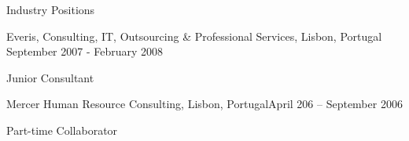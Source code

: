 
\begin{rSection}{Industry Positions}



\begin{rSubsection}{Everis, Consulting, IT, Outsourcing \&  Professional  \newline Services, Lisbon, Portugal}{ September 2007 - February 2008}{}{}
\item Junior Consultant		
\end{rSubsection}

\begin{rSubsection}{Mercer Human Resource Consulting, Lisbon, Portugal}{April 206 -- September 2006}{}{}
\item Part-time Collaborator
\end{rSubsection}

 


\end{rSection}
